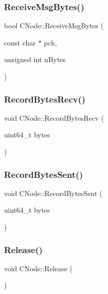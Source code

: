 \subsubsection{\texorpdfstring{Receive\+Msg\+Bytes()}{ReceiveMsgBytes()}}
{\footnotesize\ttfamily bool C\+Node\+::\+Receive\+Msg\+Bytes (\begin{DoxyParamCaption}\item[{const char $\ast$}]{pch,  }\item[{unsigned int}]{n\+Bytes }\end{DoxyParamCaption})}

\mbox{\label{class_c_node_af72b4b6e454c743af071896019ae1c69}} 
\subsubsection{\texorpdfstring{Record\+Bytes\+Recv()}{RecordBytesRecv()}}
{\footnotesize\ttfamily void C\+Node\+::\+Record\+Bytes\+Recv (\begin{DoxyParamCaption}\item[{uint64\+\_\+t}]{bytes }\end{DoxyParamCaption})\hspace{0.3cm}{\ttfamily [static]}}

\mbox{\label{class_c_node_a945c993a84eaa9d6bca18284befaccbe}} 
\subsubsection{\texorpdfstring{Record\+Bytes\+Sent()}{RecordBytesSent()}}
{\footnotesize\ttfamily void C\+Node\+::\+Record\+Bytes\+Sent (\begin{DoxyParamCaption}\item[{uint64\+\_\+t}]{bytes }\end{DoxyParamCaption})\hspace{0.3cm}{\ttfamily [static]}}

\mbox{\label{class_c_node_af804bf7c7f9794e80a3b916e1befece9}} 
\subsubsection{\texorpdfstring{Release()}{Release()}}
{\footnotesize\ttfamily void C\+Node\+::\+Release (\begin{DoxyParamCaption}{ }\end{DoxyParamCaption})\hspace{0.3cm}{\ttfamily [inline]}}

